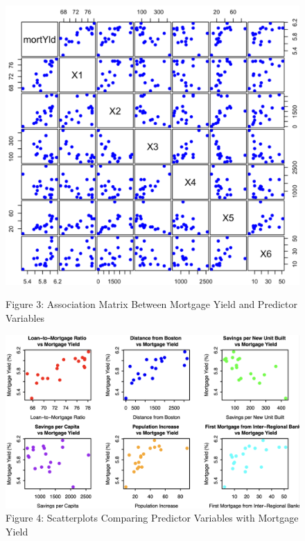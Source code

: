 \documentclass[
  12pt,
]{article}
\begin{document}
\begin{figure}[H]
\centering

\begin{minipage}[t]{0.38\textwidth}
\centering
\includegraphics[width=1\linewidth]{figures/Figure 3.png}
\captionsetup{font=normalsize}
\caption*{Figure 3: Association Matrix Between Mortgage Yield and Predictor Variables}
\end{minipage}
\hfill
\begin{minipage}[t]{0.58\textwidth}
\centering
\vspace{-5.6cm}
\includegraphics[width=1\linewidth]{figures/Figure 4.png}
\captionsetup{font=normalsize}
\caption*{Figure 4: Scatterplots Comparing Predictor Variables with Mortgage Yield}
\end{minipage}
\end{figure}
\end{document}

